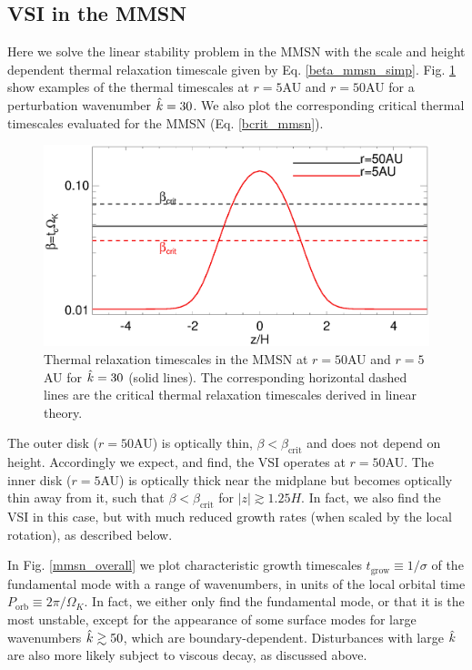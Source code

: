 \subsection{VSI in the MMSN}
Here we solve the linear stability problem in the MMSN with the scale and
height dependent thermal relaxation timescale given by
Eq. \ref{beta_mmsn_simp}.  Fig. \ref{beta_compare} show examples of
the thermal timescales at $r=5$AU and $r=50$AU for a
perturbation wavenumber $\hat{k}=30$. We also plot the 
corresponding critical thermal timescales evaluated for the MMSN
(Eq. \ref{bcrit_mmsn}).  
 \begin{figure}
  \includegraphics[width=\linewidth,clip=true,trim=0cm 0cm 0cm
  0cm]{figures/beta_compare}
  \caption{Thermal relaxation timescales in the MMSN at $r=50$AU
    and $r=5$AU for $\hat{k}=30$ (solid lines). The
    corresponding horizontal dashed lines are the critical thermal
    relaxation timescales derived in linear theory. 
    \label{beta_compare}}
\end{figure}

The outer disk ($r=50$AU) is optically thin,
$\beta<\beta_\mathrm{crit}$  and  does not depend on height.
Accordingly we expect, and find, the VSI operates at $r=50$AU. The
inner disk ($r=5$AU) is optically thick near the midplane but becomes
optically thin away from it, such that $\beta < \beta_\mathrm{crit}$
for $|z|\gtrsim1.25H$. In fact, we also find the VSI in this case, but
with much reduced growth rates (when scaled by the local rotation), as
described below.     

In Fig. \ref{mmsn_overall} we plot characteristic growth timescales
$t_\mathrm{grow} \equiv 1/\sigma$ of the fundamental mode with a range of
wavenumbers, in units of the local orbital time $P_\mathrm{orb}\equiv
2\pi/\Omega_K$. In fact, we either only find the fundamental mode, or 
that it is the most unstable, except for the appearance of some 
surface modes for large wavenumbers $\hat{k}\gtrsim 50$, which are 
boundary-dependent.  
Disturbances with large $\hat{k}$ are also more likely subject to viscous 
decay, as discussed above. 


